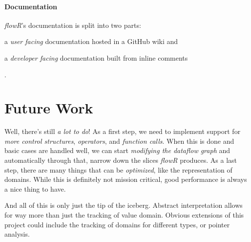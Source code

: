 \documentclass[color,coloraccent=red!60!black,listings]{poster}
\def\flowr{\textit{flowR}}
\begin{document}
\begin{multicols}{3}
	\paragraph{Documentation} \flowr's documentation is split into two parts:
	\begin{enumerate*}
		\item a \emph{user facing} documentation hosted in a GitHub wiki and
		\item a \emph{developer facing} documentation built from inline comments
	\end{enumerate*}.\par
	\section*{Future Work} Well, there's still \emph{a lot to do}! As a first step, we
	need to implement support for \emph{more control structures}, \emph{operators}, and
	\emph{function calls}. When this is done and basic cases are handled well, we can
	start \emph{modifying the dataflow graph} and automatically through that, narrow
	down the slices \flowr{} produces. As a last step, there are many things that can be
	\emph{optimized}, like the representation of domains. While this is definitely not
	mission critical, good performance is always a nice thing to have.\par
	And all of this is only just the tip of the iceberg. Abstract interpretation allows
	for way more than just the tracking of value domain. Obvious extensions of this
	project could include the tracking of domains for different types, or pointer
	analysis.
\end{multicols}
\end{document}
